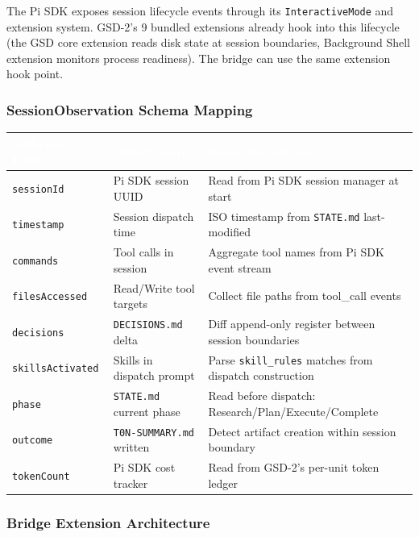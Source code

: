 \documentclass[11pt,letterpaper]{article}
\newcommand{\tableheader}[1]{\textbf{\sffamily\textcolor{white}{#1}}}
\begin{document}
The Pi SDK exposes session lifecycle events through its \texttt{InteractiveMode} and extension system. GSD-2's 9 bundled extensions already hook into this lifecycle (the GSD core extension reads disk state at session boundaries, Background Shell extension monitors process readiness). The bridge can use the same extension hook point.

\subsubsection{SessionObservation Schema Mapping}

\begin{center}
\begin{tabularx}{\textwidth}{L{3.5cm}L{3.5cm}X}
\toprule
{}
\tableheader{skill-creator Field} & \tableheader{GSD-2 Source} & \tableheader{Extraction Method} \\
\midrule
\texttt{sessionId} & Pi SDK session UUID & Read from Pi SDK session manager at start \\
\texttt{timestamp} & Session dispatch time & ISO timestamp from \texttt{STATE.md} last-modified \\
\texttt{commands} & Tool calls in session & Aggregate tool names from Pi SDK event stream \\
\texttt{filesAccessed} & Read/Write tool targets & Collect file paths from tool\_call events \\
\texttt{decisions} & \texttt{DECISIONS.md} delta & Diff append-only register between session boundaries \\
\texttt{skillsActivated} & Skills in dispatch prompt & Parse \texttt{skill\_rules} matches from dispatch construction \\
\texttt{phase} & \texttt{STATE.md} current phase & Read before dispatch: Research/Plan/Execute/Complete \\
\texttt{outcome} & \texttt{T0N-SUMMARY.md} written & Detect artifact creation within session boundary \\
\texttt{tokenCount} & Pi SDK cost tracker & Read from GSD-2's per-unit token ledger \\
\bottomrule
\end{tabularx}
\end{center}

\subsubsection{Bridge Extension Architecture}
\end{document}
